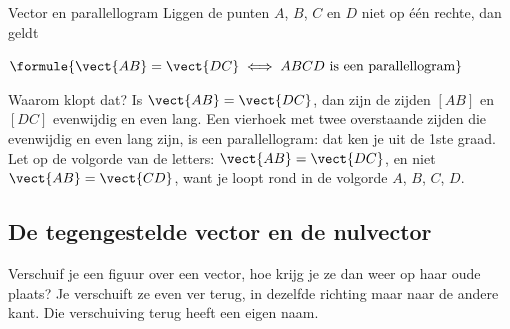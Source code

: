 \begin{theorie}
\begin{minipage}[t]{.64\linewidth}
\vspace{0pt}
\begin{stelling}{Vector en parallellogram}
Liggen de punten $A$, $B$, $C$ en $D$ niet op één rechte, dan geldt

\vspace{1mm}
\qquad $\formule{\vect{AB} = \vect{DC} \iff ABCD \text{ is een parallellogram}}$
\end{stelling}
\end{minipage}\hfill
\begin{minipage}[t]{.32\linewidth}
\vspace{2mm}
\centering
{}
\end{minipage}
\end{theorie}

Waarom klopt dat? Is $\vect{AB} = \vect{DC}$, dan zijn de zijden $[AB]$ en $[DC]$ evenwijdig en even lang. Een vierhoek met twee overstaande zijden die evenwijdig en even lang zijn, is een parallellogram: dat ken je uit de 1ste graad. Let op de volgorde van de letters: $\vect{AB} = \vect{DC}$, en niet $\vect{AB} = \vect{CD}$, want je loopt rond in de volgorde $A$, $B$, $C$, $D$.


\begin{oefeningen}
\end{oefeningen}

\subsection{De tegengestelde vector en de nulvector}

Verschuif je een figuur over een vector, hoe krijg je ze dan weer op haar oude plaats? Je verschuift ze even ver terug, in dezelfde richting maar naar de andere kant. Die verschuiving terug heeft een eigen naam.

